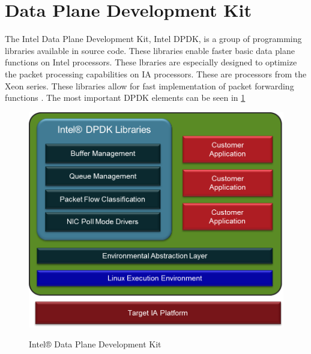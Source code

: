 \documentclass[11pt,a4paper,twoside,openright,bachelor,english]{netthesis}
\begin{document}
\section{Data Plane Development Kit}

The Intel Data Plane Development Kit, Intel DPDK, is a group of programming libraries available in source code. These libraries enable faster basic data plane functions on Intel processors. These lbraries are especially designed to optimize the packet processing capabilities on IA processors. These are processors from the Xeon series. These libraries allow for fast implementation of packet forwarding functions \cite{DPDKEx}.
The most important DPDK elements can be seen in \ref{fig:DPDKEx} 
\begin{figure}[h]
\centering
{\includegraphics[width=.75\columnwidth]{figures/IntelDPDK}} \quad
\caption[ Intel® Data Plane Development Kit]{ Intel® Data Plane Development Kit \cite{DPDKEx}}
\label{fig:DPDKEx}
\end{figure}
\end{document}
